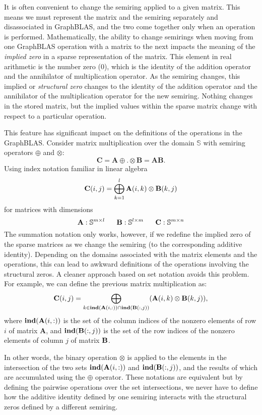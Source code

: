 It is often convenient to change the semiring applied
to a given matrix.  This means we must represent the matrix and the semiring separately and disassociated in GraphBLAS,
and the two come together only when an operation is performed.
Mathematically, the ability to change semirings 
when moving from one GraphBLAS operation with a matrix to the next impacts the meaning of 
the \emph{implied zero} in a sparse representation of the matrix.
This element in real arithmetic is the number zero ($0$), which is the 
identity of the addition operator and the annihilator of
multiplication operator.   As the semiring changes, this 
implied or \emph{structural zero} changes to the identity of 
the addition operator and the annihilator of the multiplication 
operator for the new semiring.   Nothing changes in the
stored matrix, but the implied values within the sparse matrix change
with respect to a particular operation.  

This feature has significant impact on the definitions of the operations in the GraphBLAS.   
Consider matrix multiplication over the domain $\mathbb{S}$ 
with semiring operators 
$\oplus$ and $\otimes$:
 $$
   \mathbf{C} = \mathbf{A} {\oplus}.{\otimes} \mathbf{B} = \mathbf{A} \mathbf{B}.
$$
Using index notation familiar in linear algebra
  $$
   {\bf C}(i,j) = \bigoplus_{k=1}^l {\bf A}(i,k) \otimes {\bf B}(k,j)
  $$
for matrices with dimensions
$$
  {\bf A} : \mathbb{S}^{m \times l} ~~~~~
  {\bf B} : \mathbb{S}^{l \times m} ~~~~~
  {\bf C} : \mathbb{S}^{m \times n}
$$
The summation notation only works, however, if we redefine the implied zero of the 
sparse matrices as we change the semiring (to the corresponding additive identity).   Depending on the domains associated with the
matrix elements and the operations, this can lead to awkward definitions of the
operations involving the structural zeros.  A cleaner approach based on set notation
avoids this problem.  For example, we can define the previous matrix multiplication
as:   
$$
\mathbf{C}(i,j)
= \bigoplus_{k \in \mathbf{ind}({\bf {A}}(i,:)) \cap
\mathbf{ind}({\bf {B}}(:,j))} ({\bf {A}}(i,k)
\otimes {\bf {B}}(k,j)),
$$ 
where $\mathbf{ind}({\bf {A}}(i,:))$ is the set of the column indices of the 
nonzero elements of row $i$ of matrix $\mathbf{A}$, and
$\mathbf{ind}({\bf {B}}(:,j))$ is the set of the row indices of the 
nonzero elements of column $j$ of matrix ${\bf B}$.

In other words, the binary operation $\otimes$ is applied to the elements in the intersection of the 
two sets $\mathbf{ind}({\bf {A}}(i,:))$ and $\mathbf{ind}({\bf {B}}(:,j))$, and the results of which are accumulated using the $\oplus$ operator.
These notations are equivalent but by defining the pairwise operations over
the set intersections, we never have to define how the additive identity defined by one
semiring interacts with the structural zeros defined by a different semiring.

